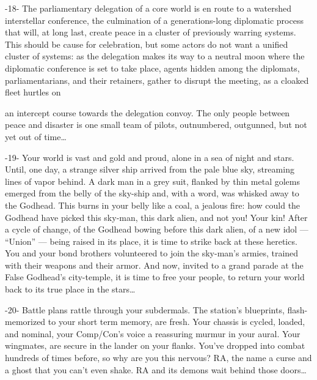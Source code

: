                                                     -18-  
The parliamentary delegation of a core world is en route to a watershed interstellar conference,  
the culmination of a generations-long diplomatic process that will, at long last, create peace in a  
cluster of previously warring systems. This should be cause for celebration, but some actors do  
not want a unified cluster of systems: as the delegation makes its way to a neutral moon where  
the diplomatic conference is set to take place, agents hidden among the diplomats,  
parliamentarians, and their retainers, gather to disrupt the meeting, as a cloaked fleet hurtles on  

                                                                                                          


an intercept course towards the delegation convoy. The only people between peace and disaster  
is one small team of pilots, outnumbered, outgunned, but not yet out of time…  

                                                        -19-  
Your world  is vast and gold and proud, alone in a sea of night and stars. Until, one day, a strange  
silver ship arrived from the pale blue sky, streaming lines of vapor behind. A dark man in a grey  
suit, flanked by thin metal golems emerged from the belly of the sky-ship and, with a word, was  
whisked away to the Godhead. This burns in your belly like a coal, a jealous fire: how could the  
Godhead have picked this sky-man, this dark alien, and not you! Your kin! After a cycle of change,  
of the Godhead bowing before this dark alien, of a new idol — “Union” — being raised in its  
place, it is time to strike back at these heretics. You and your bond brothers volunteered to join  
the sky-man’s armies, trained with their weapons and their armor. And now, invited to a grand  
parade at the False Godhead’s city-temple, it is time to free your people, to return your world  
back to its true place in the stars…  

                                                        -20-  
Battle plans rattle through your subdermals. The station’s blueprints, flash-memorized to your  
short term memory, are fresh. Your chassis is cycled, loaded, and nominal, your Comp/Con’s  
voice a reassuring murmur in your aural. Your wingmates, are secure in the lander on your flanks.  
You’ve dropped into combat hundreds of times before, so why are you this nervous? RA, the  
name a curse and a ghost that you can’t even shake. RA and its demons wait behind those  
doors…  

